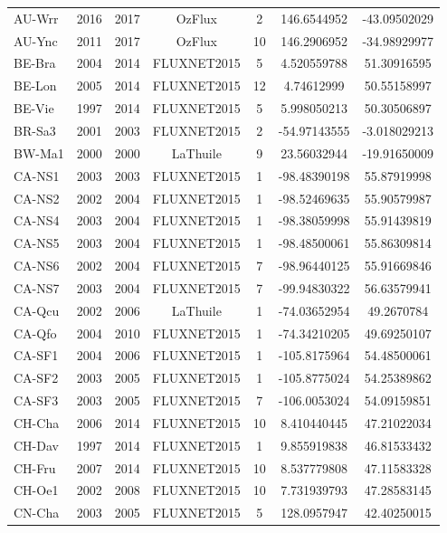 \begin{center}
\begin{longtable}{lcccccc}
AU-Wrr & 2016 & 2017 & OzFlux      & 2      & 146.6544952  & -43.09502029 \\
AU-Ync & 2011 & 2017 & OzFlux      & 10     & 146.2906952  & -34.98929977 \\
BE-Bra & 2004 & 2014 & FLUXNET2015 & 5      & 4.520559788  & 51.30916595  \\
BE-Lon & 2005 & 2014 & FLUXNET2015 & 12     & 4.74612999   & 50.55158997  \\
BE-Vie & 1997 & 2014 & FLUXNET2015 & 5      & 5.998050213  & 50.30506897  \\
BR-Sa3 & 2001 & 2003 & FLUXNET2015 & 2      & -54.97143555 & -3.018029213 \\
BW-Ma1 & 2000 & 2000 & LaThuile    & 9      & 23.56032944  & -19.91650009 \\
CA-NS1 & 2003 & 2003 & FLUXNET2015 & 1      & -98.48390198 & 55.87919998  \\
CA-NS2 & 2002 & 2004 & FLUXNET2015 & 1      & -98.52469635 & 55.90579987  \\
CA-NS4 & 2003 & 2004 & FLUXNET2015 & 1      & -98.38059998 & 55.91439819  \\
CA-NS5 & 2003 & 2004 & FLUXNET2015 & 1      & -98.48500061 & 55.86309814  \\
CA-NS6 & 2002 & 2004 & FLUXNET2015 & 7      & -98.96440125 & 55.91669846  \\
CA-NS7 & 2003 & 2004 & FLUXNET2015 & 7      & -99.94830322 & 56.63579941  \\
CA-Qcu & 2002 & 2006 & LaThuile    & 1      & -74.03652954 & 49.2670784   \\
CA-Qfo & 2004 & 2010 & FLUXNET2015 & 1      & -74.34210205 & 49.69250107  \\
CA-SF1 & 2004 & 2006 & FLUXNET2015 & 1      & -105.8175964 & 54.48500061  \\
CA-SF2 & 2003 & 2005 & FLUXNET2015 & 1      & -105.8775024 & 54.25389862  \\
CA-SF3 & 2003 & 2005 & FLUXNET2015 & 7      & -106.0053024 & 54.09159851  \\
CH-Cha & 2006 & 2014 & FLUXNET2015 & 10     & 8.410440445  & 47.21022034  \\
CH-Dav & 1997 & 2014 & FLUXNET2015 & 1      & 9.855919838  & 46.81533432  \\
CH-Fru & 2007 & 2014 & FLUXNET2015 & 10     & 8.537779808  & 47.11583328  \\
CH-Oe1 & 2002 & 2008 & FLUXNET2015 & 10     & 7.731939793  & 47.28583145  \\
CN-Cha & 2003 & 2005 & FLUXNET2015 & 5      & 128.0957947  & 42.40250015  \\

\end{longtable}
\end{center}
